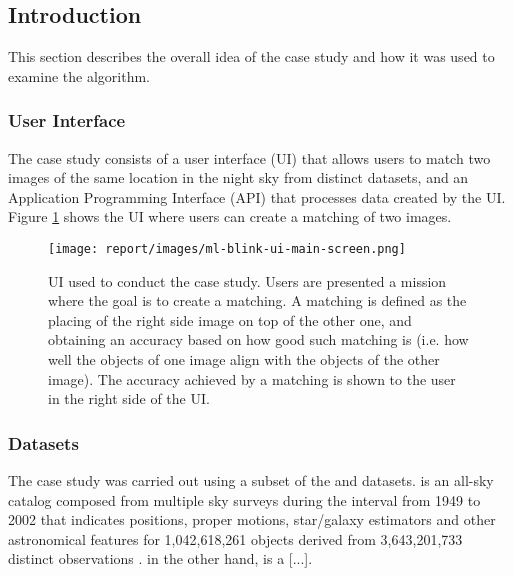 \subsection{Introduction} \label{subsect:case-study:intro}

This section describes the overall idea of the case study and how it was used to examine the \mlblink algorithm.

\subsubsection{User Interface} \label{subsubsect:case-study:intro:ui}
The case study consists of a user interface (UI) that allows users to match two images of the same location in the night sky from distinct datasets, and an Application Programming Interface (API) that processes data created by the UI. Figure \ref{fig:ml-blink-ui-main-screen} shows the UI where users can create a matching of two images.

\begin{figure}[H]
  \centering
  \texttt{[image: report/images/ml-blink-ui-main-screen.png]}
  \caption{UI used to conduct the case study. Users are presented a mission where the goal is to create a matching. A matching is defined as the placing of the right side image on top of the other one, and obtaining an accuracy based on how good such matching is (i.e. how well the objects of one image align with the objects of the other image). The accuracy achieved by a matching is shown to the user in the right side of the UI.}
  \label{fig:ml-blink-ui-main-screen}
\end{figure}

\subsubsection{Datasets} \label{subsubsect:case-study:intro:datasets}

The case study was carried out using a subset of the \usno and \panstarrs datasets. \usno is an all-sky catalog composed from multiple sky surveys during the interval from 1949 to 2002 \cite{web:caltech:usno} that indicates positions, proper motions, star/galaxy estimators and other astronomical features for 1,042,618,261 objects derived from 3,643,201,733 distinct observations \cite{web:ap-i:usno}. \panstarrs in the other hand, is a [...].

